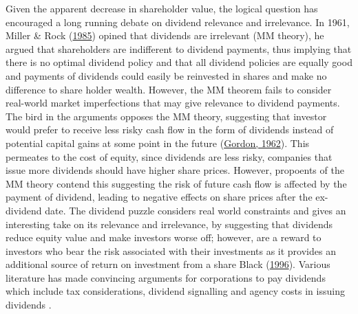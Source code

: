 \documentclass[11pt,preprint, authoryear]{elsarticle}
\numberwithin{equation}{section}
\numberwithin{figure}{section}
\numberwithin{table}{section}
\begin{document}
Given the apparent decrease in shareholder value, the logical question
has encouraged a long running debate on dividend relevance and
irrelevance. In 1961, Miller \& Rock
(\protect\hyperlink{ref-miller1985dividend}{1985}) opined that dividends
are irrelevant (MM theory), he argued that shareholders are indifferent
to dividend payments, thus implying that there is no optimal dividend
policy and that all dividend policies are equally good and payments of
dividends could easily be reinvested in shares and make no difference to
share holder wealth. However, the MM theorem fails to consider
real-world market imperfections that may give relevance to dividend
payments. The bird in the arguments opposes the MM theory, suggesting
that investor would prefer to receive less risky cash flow in the form
of dividends instead of potential capital gains at some point in the
future (\protect\hyperlink{ref-gordon1962}{Gordon, 1962}). This
permeates to the cost of equity, since dividends are less risky,
companies that issue more dividends should have higher share prices.
However, propoents of the MM theory contend this suggesting the risk of
future cash flow is affected by the payment of dividend, leading to
negative effects on share prices after the ex-dividend date. The
dividend puzzle considers real world constraints and gives an
interesting take on its relevance and irrelevance, by suggesting that
dividends reduce equity value and make investors worse off; however, are
a reward to investors who bear the risk associated with their
investments as it provides an additional source of return on investment
from a share Black (\protect\hyperlink{ref-black1996dividend}{1996}).
Various literature has made convincing arguments for corporations to pay
dividends which include tax considerations, dividend signalling and
agency costs in issuing dividends .
\end{document}
